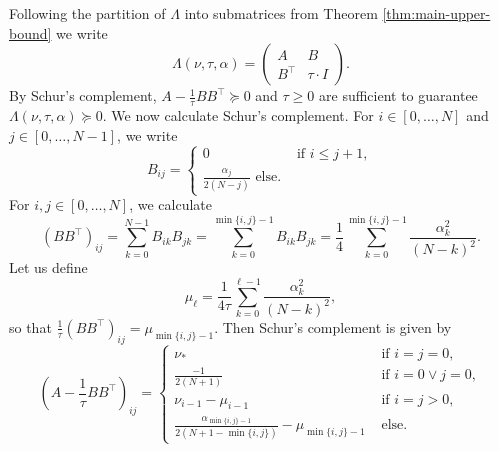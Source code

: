 \documentclass{article}
\begin{document}
\begin{appendixproof}

Following the partition of $\Lambda$ into submatrices from Theorem \ref{thm:main-upper-bound} we write 
\[
\Lambda(\nu, \tau, \alpha) =\left(\begin{array}{cc}
    A & B \\
    B^\top & \tau\cdot I
\end{array}\right).
\]
By Schur's complement, $A-\frac1\tau B B^\top\succeq 0$ and $\tau\geq 0$ are sufficient to guarantee $\Lambda(\nu, \tau, \alpha)\succeq 0$.
We now calculate Schur's complement.
For $i\in[0,\dots,N]$ and $j\in[0,\dots,N-1]$, we write
\[
B_{ij}=\begin{cases}
    0&\text{ if }i\le j+1,\\
    \frac{\alpha_j}{2(N-j)}\text{ else.}
\end{cases}
\]
For $i,j\in[0,\dots,N]$, we calculate
\[
(B B^\top)_{ij}=\sum_{k=0}^{N-1}B_{ik}B_{jk}=\sum_{k=0}^{\min\{i,j\}-1}B_{ik}B_{jk}=\frac14\sum_{k=0}^{\min\{i,j\}-1}\frac{\alpha_k^2}{(N-k)^2}.
\]
Let us define
\[
\mu_\ell=\frac1{4\tau}\sum_{k=0}^{\ell-1}\frac{\alpha_k^2}{(N-k)^2},
\]
so that $\frac1\tau(B B^\top)_{ij}=\mu_{\min\{i,j\}-1}$. 
Then Schur's complement is given by
\[
\left(A-\frac1\tau BB^\top\right)_{ij}=\begin{cases}
    \nu_*&\text{ if }i=j=0,\\
    \frac{-1}{2(N+1)}&\text{ if }i=0\vee j=0,\\
    \nu_{i-1}-\mu_{i-1}&\text{ if }i=j>0,\\
    \frac{\alpha_{\min\{i,j\}-1}}{2(N+1-\min\{i,j\})}-\mu_{\min\{i,j\}-1}&\text{ else.}
\end{cases}
\]



\end{appendixproof}
\end{document}
